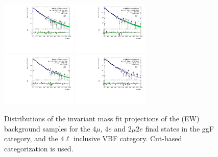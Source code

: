 \begin{figure}[htbp]
    \centering
    \includegraphics[width=0.32\textwidth]{figures/HMHZZ/background/cut_based/bkg_shape_qqZZEW_ggF_4mu_180_to_2200_log.pdf}
    \includegraphics[width=0.32\textwidth]{figures/HMHZZ/background/cut_based/bkg_shape_qqZZEW_ggF_4e_180_to_2200_log.pdf} \\
    \includegraphics[width=0.32\textwidth]{figures/HMHZZ/background/cut_based/bkg_shape_qqZZEW_ggF_2mu2e_180_to_2200_log.pdf}
    \includegraphics[width=0.32\textwidth]{figures/HMHZZ/background/cut_based/bkg_shape_qqZZEW_VBF_incl_180_to_2200_log.pdf}
    \caption{Distributions of the \mfl invariant mass fit projections of the \qqZZ (EW) background samples for the
    $4\mu$, $4e$ and $2\mu 2e$ final states in the ggF category, and the $4\ell$ inclusive VBF category. 
    Cut-based categorization is used.} 
    \label{fig:qqZZEW_m4l_shape_all_cut_based}
\end{figure}

